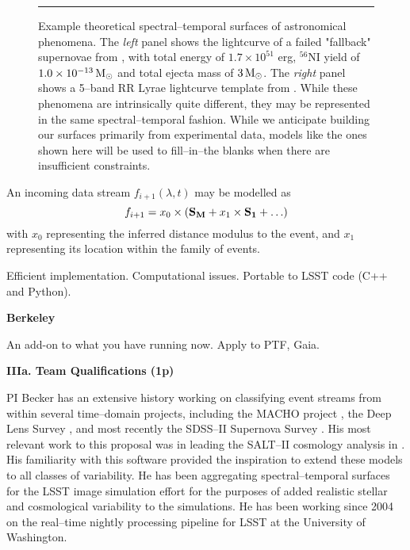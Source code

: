 \begin{figure}[t]
\centerline{ \hfil
{}} \smallskip
\caption[]{\footnotesize Example theoretical spectral--temporal surfaces of
astronomical phenomena.  The {\it left} panel shows the lightcurve of a failed
"fallback" supernovae from \cite{2009ApJ...707..193F}, with total energy of $1.7
\times 10^{51}$ erg, $^{56}$NI yield of $1.0 \times 10^{-13} {\rm\,M_\odot}$ and total
ejecta mass of $3 {\rm\,M_\odot}$.  The {\it right} panel shows a 5--band RR Lyrae
lightcurve template from \cite{2010ApJ...708..717S}.  While these phenomena are
intrinsically quite different, they may be represented in the same
spectral--temporal fashion.  While we anticipate building our surfaces primarily
from experimental data, models like the ones shown here will be used to
fill--in--the blanks when there are insufficient constraints.} \medskip \hrule
\label{fig:sts} \end{figure}


 

An incoming data stream $f_{i+1}(\lambda, t)$ may be modelled as $$f_{i+1} = x_0
\times ({\bf S_M} + x_1 \times {\bf S_1} + \ldots)$$ with $x_0$ representing the
inferred distance modulus to the event, and $x_1$ representing its location
within the family of events.

Efficient implementation.  Computational issues.  Portable to LSST code (C++ and
Python).

 \smallskip
{\bf Berkeley}

An add-on to what you have running now.  Apply to PTF, Gaia.



\bigskip \centerline{\bf IIIa. Team Qualifications (1p)} \smallskip

 \smallskip

PI Becker has an extensive history working on classifying event streams from
within several time--domain projects, including the MACHO project
\citep{2000PhDT.......258B}, the Deep Lens Survey \citep{2004ApJ...611..418B},
and most recently the SDSS--II Supernova Survey
\citep{2008AJ....135..338F,2008AJ....135..348S}.  His most relevant work to this
proposal was in leading the SALT--II cosmology analysis in
\cite{2009ApJS..185...32K}.  His familiarity with this software provided the
inspiration to extend these models to all classes of variability. He has been
aggregating spectral--temporal surfaces for the LSST image simulation effort
\citep{2010SPIE.7738E..53C} for the purposes of added realistic stellar and
cosmological variability to the simulations.  He has been working since 2004 on
the real--time nightly processing pipeline for LSST at the University of
Washington.

